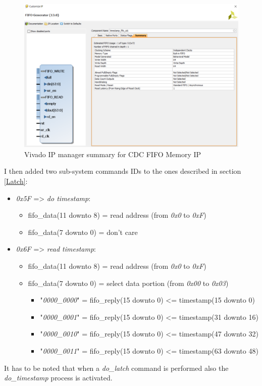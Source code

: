 \begin{figure}[H]
	\centering
	\includegraphics[width=0.6\linewidth]{IMG/ch4/FIFO_IP}
	\caption{Vivado IP manager summary for CDC FIFO Memory IP}
	\label{fig:fifo_ip}
\end{figure}
\noindent I then added two sub-system commands IDs to the ones described in section \ref{Latch}:
\begin{itemize}
	\item \textit{0x5F} => \textit{do timestamp}:
	\begin{itemize}
		\item fifo\_data(11 downto 8) = read address (from \textit{0x0} to \textit{0xF})
		\item fifo\_data(7 downto 0) = don't care
	\end{itemize}
	\item \textit{0x6F} => \textit{read timestamp}:
	\begin{itemize}
		\item fifo\_data(11 downto 8) = read address (from \textit{0x0} to \textit{0xF})
		\item fifo\_data(7 downto 0) = select data portion (from \textit{0x00} to \textit{0x03})
		\begin{itemize}
			\item "\textit{0000\_0000}" = fifo\_reply(15 downto 0) <= timestamp(15 downto 0)
			\item "\textit{0000\_0001}" = fifo\_reply(15 downto 0) <= timestamp(31 downto 16)
			\item "\textit{0000\_0010}" = fifo\_reply(15 downto 0) <= timestamp(47 downto 32)
			\item "\textit{0000\_0011}" = fifo\_reply(15 downto 0) <= timestamp(63 downto 48)
		\end{itemize}
	\end{itemize}
\end{itemize}
\noindent It has to be noted that when a \textit{do\_latch} command is performed also the \textit{do\_timestamp} process is activated.
